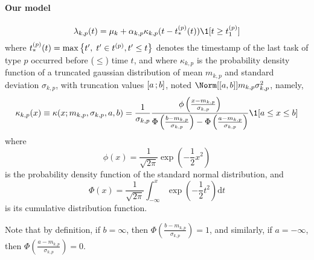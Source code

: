 \paragraph{Our model}
\begin{equation}\label{eq:model_intensity}
    \lambda_{k,p}(t)  = \mu_k + \alpha_{k,p}\kappa_{k,p}(t - t_*^{(p)}(t))\1[t \geq t_1^{(p)}]
\end{equation}
where $t_*^{(p)}(t) = \max\left\lbrace t',\; t' \in t^{(p)}, t' \leq t \right\rbrace$ denotes the timestamp of the last task of type $p$ occurred before ($\leq$) time $t$, and where $\kappa_{k,p}$ is the probability density function of a truncated gaussian distribution of mean $m_{k,p}$ and standard deviation $\sigma_{k,p}$, with truncation values $\left[ a \, ; b \right]$, noted $\Norm[\bracks{a,b}]{m_{k,p}}{\sigma_{k,p}^2}$, namely,
\begin{equation}\label{eq:kernel_trunc_norm}
    \kappa_{k,p}(x) \equiv \kappa(x ; m_{k,p}, \sigma_{k,p}, a, b)=\frac{1}{\sigma_{k,p}} \frac{\phi\left(\frac{x-m_{k,p}}{\sigma_{k,p}}\right)}{\Phi\left(\frac{b-m_{k,p}}{\sigma_{k,p}}\right)-\Phi\left(\frac{a-m_{k,p}}{\sigma_{k,p}}\right)} \1[a\leq x\leq b]
\end{equation}
where
$$
\phi(x) = \frac{1}{\sqrt{2\pi}}\exp\left(-\frac{1}{2}x^2\right)
$$ 
is the probability density function of the standard normal distribution, and
$$
\Phi(x) = \frac{1}{\sqrt{2\pi}} \int_{-\infty}^x \exp\left(-\frac{1}{2}t^2\right) \mathrm{d}t
$$
is its cumulative distribution function.

Note that by definition, if $b=\infty$, then $\Phi\left(\frac{b-m_{k,p}}{\sigma_{k,p}}\right) = 1$, and similarly, if $a=-\infty$, then $\Phi\left(\frac{a-m_{k,p}}{\sigma_{k,p}}\right) = 0$.